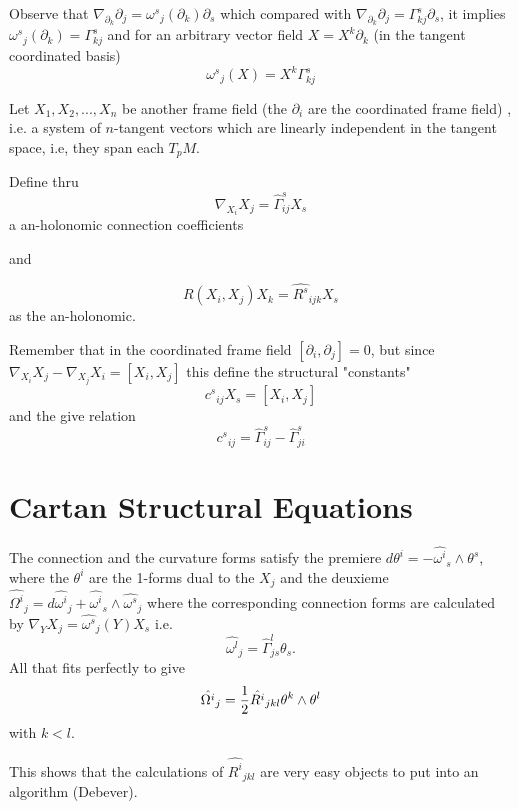 \documentclass[12pt]{article}
\begin{document}
Observe that $\nabla_{\partial_k}\partial_j={\omega^s}_j(\partial_k)\partial_s$ which compared with $\nabla_{\partial_k}\partial_j=\Gamma^s_{kj}\partial_s$, it implies ${\omega^s}_j(\partial_k)=\Gamma^s_{kj}$
and for an arbitrary vector field $X=X^k\partial_k$ (in the tangent coordinated basis)
$${\omega^s}_j(X)=X^k\Gamma^s_{kj}$$


Let $X_1,X_2,...,X_n$ be another frame field (the $\partial_i$ are the coordinated frame field) , i.e. a system of $n$-tangent vectors which are linearly independent in the tangent space, i.e, they span each $T_pM$.

Define thru $$\nabla_{X_i}X_j=\hat{\Gamma}^s_{ij}X_s$$ 
a an-holonomic connection coefficients

and 

$$R(X_i,X_j)X_k={  {\hat{R^s}}  }_{ijk} X_s$$
as the an-holonomic.

Remember that in the coordinated frame field $[\partial_i,\partial_j]=0$, but since $\nabla_{X_i}X_j-\nabla_{X_j}X_i=[X_i,X_j]$  this define the structural "constants" 
$${c^s}_{ij}X_s=[X_i,X_j]$$
and the give relation
$${c^s}_{ij}=\hat{\Gamma}^s_{ij}-\hat{\Gamma}^s_{ji}$$


\section{\bf Cartan Structural Equations}

The connection and the curvature forms satisfy the premiere
$d\theta^i=- {\hat{\omega^i}}_s\wedge\theta^s$, 
where the $\theta^i$ are the 1-forms dual to the $X_j$ and the deuxieme 
${\hat{\Omega^i}}_j=d{{ \hat{\omega^i}} }_j+{{ \hat{\omega^i}} }_s\wedge
{{\hat{\omega^s}} }_j$
where the corresponding connection forms are calculated by
$\nabla_YX_j=\hat{\omega^s}_j(Y)X_s$
i.e.
$$\hat{\omega^l}_j=\hat{\Gamma}^l_{js}\theta_s.$$
All that fits perfectly to give
$$\hat{\Omega^i}_j={1\over2}\hat{R^i}_{jkl} \theta^k \wedge \theta^l$$
with $k<l$.

This shows that the calculations of $\hat{R^i}_{jkl}$ are very easy objects to put into an algorithm (Debever).
\end{document}
